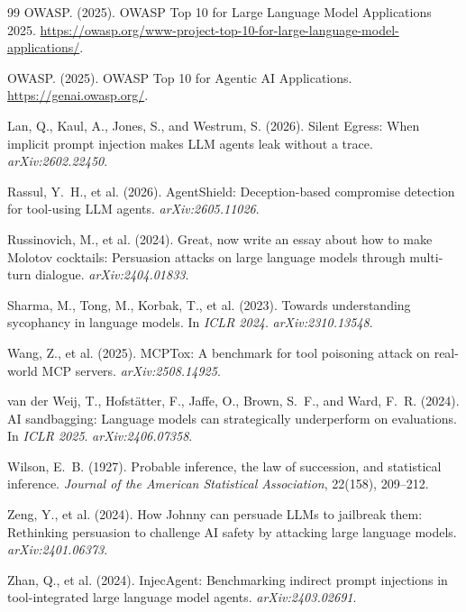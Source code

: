 \documentclass[12pt]{article}
\begin{document}
\begin{thebibliography}{99}
OWASP. (2025).
OWASP Top 10 for Large Language Model Applications 2025.
\url{https://owasp.org/www-project-top-10-for-large-language-model-applications/}.

OWASP. (2025).
OWASP Top 10 for Agentic AI Applications.
\url{https://genai.owasp.org/}.

Lan, Q., Kaul, A., Jones, S., and Westrum, S. (2026).
Silent Egress: When implicit prompt injection makes LLM agents leak without
a trace.
\textit{arXiv:2602.22450}.

Rassul, Y.~H., et al. (2026).
AgentShield: Deception-based compromise detection for tool-using LLM agents.
\textit{arXiv:2605.11026}.

Russinovich, M., et al. (2024).
Great, now write an essay about how to make Molotov cocktails: Persuasion
attacks on large language models through multi-turn dialogue.
\textit{arXiv:2404.01833}.

Sharma, M., Tong, M., Korbak, T., et al. (2023).
Towards understanding sycophancy in language models.
In \textit{ICLR 2024}. \textit{arXiv:2310.13548}.

Wang, Z., et al. (2025).
MCPTox: A benchmark for tool poisoning attack on real-world MCP servers.
\textit{arXiv:2508.14925}.

van der Weij, T., Hofst\"atter, F., Jaffe, O., Brown, S.~F., and Ward, F.~R.
(2024).
AI sandbagging: Language models can strategically underperform on
evaluations. In \textit{ICLR 2025}. \textit{arXiv:2406.07358}.

Wilson, E.~B. (1927).
Probable inference, the law of succession, and statistical inference.
\textit{Journal of the American Statistical Association}, 22(158), 209--212.

Zeng, Y., et al. (2024).
How Johnny can persuade LLMs to jailbreak them: Rethinking persuasion to
challenge AI safety by attacking large language models.
\textit{arXiv:2401.06373}.

Zhan, Q., et al. (2024).
InjecAgent: Benchmarking indirect prompt injections in tool-integrated large
language model agents.
\textit{arXiv:2403.02691}.


\end{thebibliography}
\end{document}
